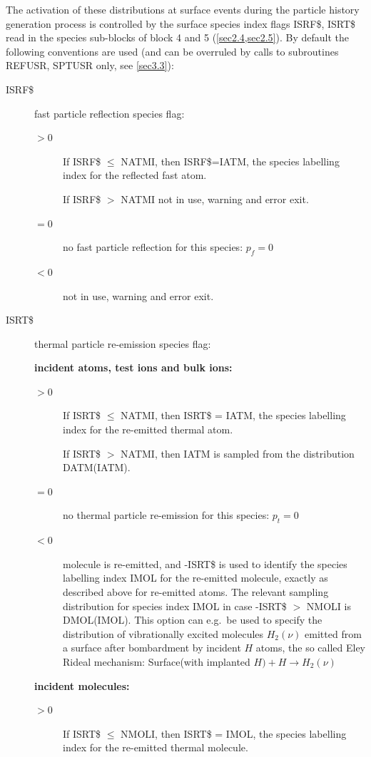 The activation of these distributions at surface events during the particle
history generation process is controlled by the surface species index flags
ISRF\$, ISRT\$ read in the species sub-blocks of block 4 and 5
(\cref{sec2.4,sec2.5}).
By default the following conventions are used (and can be overruled by calls to
subroutines REFUSR, SPTUSR only, see \cref{sec3.3}):
\begin{description}
  \item[ISRF\$] fast particle reflection species flag:

        \begin{description}
          \item[$> 0$] If ISRF\$ $\le$ NATMI, then ISRF\$=IATM, the species labelling
                index for the reflected fast atom.

                If ISRF\$ $>$  NATMI not in use, warning and error exit.
          \item[$= 0$] no fast particle reflection for this species: $p_f = 0 $
          \item[$<
                  0$] not in use, warning and error exit.

        \end{description}
  \item[ISRT\$] thermal particle re-emission species flag:

        \textbf{incident atoms, test ions and bulk ions:}
        \begin{description}
          \item[$>
                  0$] If ISRT\$ $\le$ NATMI, then ISRT\$ = IATM, the species labelling index for
                the re-emitted thermal atom.

                If ISRT\$ $>$  NATMI, then IATM is sampled from the distribution DATM(IATM).
          \item[$= 0$] no thermal particle re-emission for this species: $p_t = 0 $
          \item[$< 0$] molecule is re-emitted, and -ISRT\$ is used to identify the
                species labelling index IMOL for the re-emitted molecule, exactly as described
                above for re-emitted atoms.
                The relevant sampling distribution for species index IMOL in case -ISRT\$ $>$
                NMOLI is DMOL(IMOL).
                This option can e.g.\ be used to specify the distribution of vibrationally
                excited molecules $H_2(\nu)$ emitted from a surface after bombardment by
                incident $H$ atoms, the so called Eley Rideal mechanism:
                Surface(with implanted $H) + H \rightarrow H_2(\nu)$
        \end{description}
        \textbf{incident molecules:}
        \begin{description}
          \item[$> 0$] If ISRT\$ $\le$
                NMOLI, then ISRT\$ = IMOL, the species labelling index for the re-emitted
                thermal molecule.


\end{description}
\end{description}
